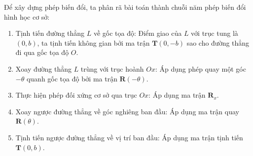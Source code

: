 Để xây dựng phép biến đổi, ta phân rã bài toán thành chuỗi năm phép biến đổi hình học cơ sở:
\begin{enumerate}
    \item Tịnh tiến đường thẳng $L$ về gốc tọa độ: Điểm giao của $L$ với trục tung là $(0, b)$, ta tịnh tiến không gian bởi ma trận $\mathbf{T}(0, -b)$ sao cho đường thẳng đi qua gốc tọa độ $O$.
    \item Xoay đường thẳng $L$ trùng với trục hoành $Ox$: Áp dụng phép quay một góc $-\theta$ quanh gốc tọa độ bởi ma trận $\mathbf{R}(-\theta)$.
    \item Thực hiện phép đối xứng cơ sở qua trục $Ox$: Áp dụng ma trận $\mathbf{R}_x$.
    \item Xoay ngược đường thẳng về góc nghiêng ban đầu: Áp dụng ma trận quay $\mathbf{R}(\theta)$.
    \item Tịnh tiến ngược đường thẳng về vị trí ban đầu: Áp dụng ma trận tịnh tiến $\mathbf{T}(0, b)$.
\end{enumerate}

